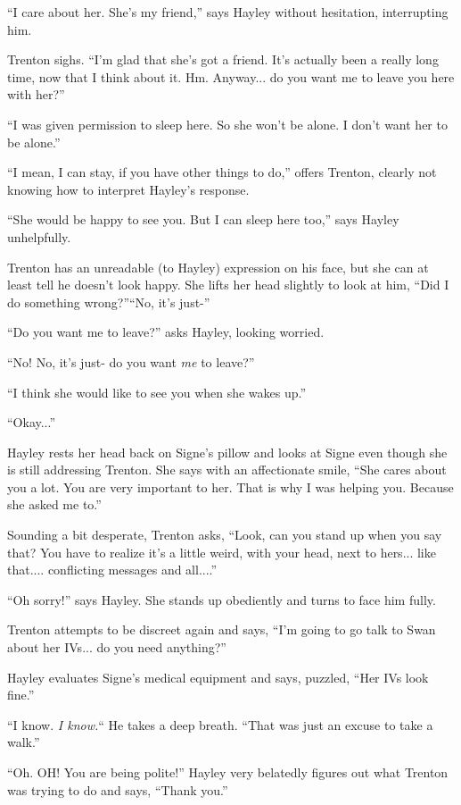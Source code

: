``I care about her.  She's my friend,'' says Hayley without hesitation, interrupting him.

Trenton sighs.  ``I'm glad that she's got a friend.  It's actually been a really long time, now that I think about it.  Hm.  Anyway... do you want me to leave you here with her?''

``I was given permission to sleep here.  So she won't be alone.  I don't want her to be alone.''

``I mean, I can stay, if you have other things to do,'' offers Trenton, clearly not knowing how to interpret Hayley's response.

``She would be happy to see you.  But I can sleep here too,'' says Hayley unhelpfully.

Trenton has an unreadable (to Hayley) expression on his face, but she can at least tell he doesn't look happy.  She lifts her head slightly to look at him, ``Did I do something wrong?''``No, it's just-''

``Do you want me to leave?'' asks Hayley, looking worried.

``No!  No, it's just- do you want \textit{me} to leave?''

``I think she would like to see you when she wakes up.''

``Okay...''

Hayley rests her head back on Signe's pillow and looks at Signe even though she is still addressing Trenton.  She says with an affectionate smile, ``She cares about you a lot.  You are very important to her.  That is why I was helping you.  Because she asked me to.''

Sounding a bit desperate, Trenton asks, ``Look, can you stand up when you say that?  You have to realize it's a little weird, with your head, next to hers... like that.... conflicting messages and all....''

``Oh sorry!'' says Hayley.  She stands up obediently and turns to face him fully.

Trenton attempts to be discreet again and says, ``I'm going to go talk to Swan about her IVs... do you need anything?''

Hayley evaluates Signe's medical equipment and says, puzzled, ``Her IVs look fine.'' 

``I know.  \textit{I know.}`` He takes a deep breath. ``That was just an excuse to take a walk.'' 

``Oh.  OH!  You are being polite!'' Hayley very belatedly figures out what Trenton was trying to do and says, ``Thank you.''

